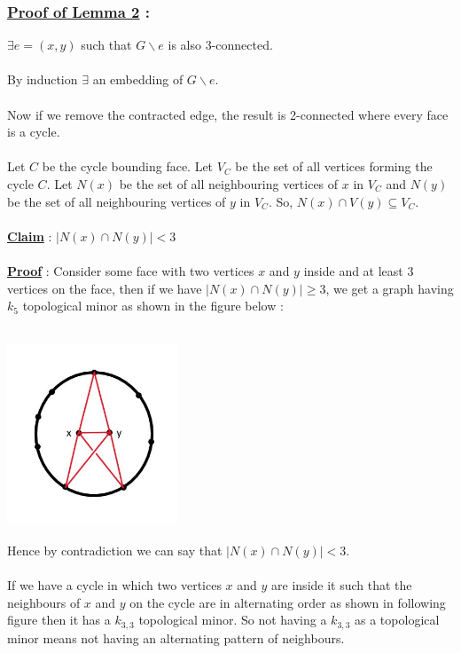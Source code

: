 \documentclass{article}
\begin{document}
    \subsubsection*{\underline{\textbf{Proof of Lemma 2}} :}
    $\exists e = (x,y)$ such that $G \backslash e$ is also 3-connected.
    \\\\
    By induction $\exists$ an embedding of $G \backslash e$.
    \\\\
    Now if we remove the contracted edge, the result is 2-connected where every face is a cycle.
    \\\\
    Let $C$ be the cycle bounding face. Let $V_{C}$ be the set of all vertices forming the cycle $C$. Let $N(x)$ be the set of all neighbouring vertices of $x$ in $V_{C}$ and $N(y)$ be the set of all neighbouring vertices of $y$ in $V_{C}$. So, $N(x) \cap V(y) \subseteq V_{C}$.
    \\\\
    \underline{\textbf{Claim}} : $ |N(x) \cap N(y)|<3$
    \\\\
    \underline{\textbf{Proof}} : 
    Consider some face with two vertices $x$ and $y$ inside and at least 3 vertices on the face, then if we have  $ |N(x) \cap N(y)| \geq 3$, we get a graph having $k_{5}$ topological minor as shown in the figure below : 
    \\\\
    \centerline{\includegraphics[width=2in]{Images/k5.jpg}} 
    Hence by contradiction we can say that $ |N(x) \cap N(y)|<3 $.
    \\\\
    If we have a cycle in which two vertices $x$ and $y$ are inside it such that the neighbours of $x$ and $y$ on the cycle are in alternating order as shown in following figure then it has a $k_{3,3}$ topological minor. So not having a $k_{3,3}$ as a topological minor means not having an alternating pattern of neighbours.
\end{document}

